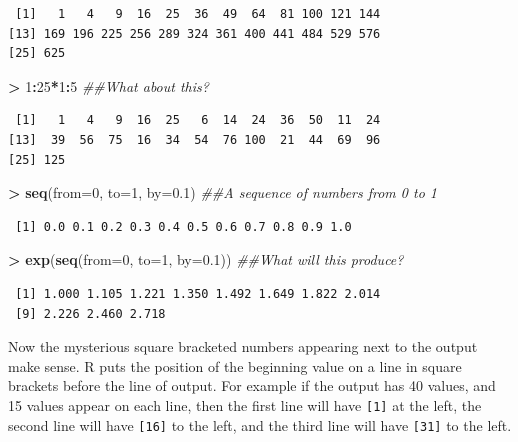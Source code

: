 \documentclass[
]{krantz}
\makeatletter
\newenvironment{Shaded}{\begin{snugshade}}{\end{snugshade}}
\newcommand{\CommentTok}[1]{\textcolor[rgb]{0.37,0.37,0.37}{\textit{#1}}}
\newcommand{\DataTypeTok}[1]{\textcolor[rgb]{0.27,0.27,0.27}{#1}}
\newcommand{\DecValTok}[1]{\textcolor[rgb]{0.06,0.06,0.06}{#1}}
\newcommand{\FloatTok}[1]{\textcolor[rgb]{0.06,0.06,0.06}{#1}}
\newcommand{\KeywordTok}[1]{\textcolor[rgb]{0.27,0.27,0.27}{\textbf{#1}}}
\newcommand{\NormalTok}[1]{#1}
\newcommand{\OperatorTok}[1]{\textcolor[rgb]{0.43,0.43,0.43}{\textbf{#1}}}
\newcommand{\StringTok}[1]{\textcolor[rgb]{0.5,0.5,0.5}{#1}}
\newenvironment{kframe}{%
\medskip{}
\setlength{\fboxsep}{.8em}
 \def\at@end@of@kframe{}%
 \ifinner\ifhmode%
  \def\at@end@of@kframe{\end{minipage}}%
  \begin{minipage}{\columnwidth}%
 \fi\fi%
 \def\FrameCommand##1{\hskip\@totalleftmargin \hskip-\fboxsep
 \colorbox{shadecolor}{##1}\hskip-\fboxsep
     \hskip-\linewidth \hskip-\@totalleftmargin \hskip\columnwidth}%
 \MakeFramed {\advance\hsize-\width
   \@totalleftmargin\z@ \linewidth\hsize
   \@setminipage}}%
 {\par\unskip\endMakeFramed%
 \at@end@of@kframe}
\renewenvironment{Shaded}{\begin{kframe}}{\end{kframe}}
\makeatother
\begin{document}
\begin{verbatim}
 [1]   1   4   9  16  25  36  49  64  81 100 121 144
[13] 169 196 225 256 289 324 361 400 441 484 529 576
[25] 625
\end{verbatim}

\begin{Shaded}
\begin{Highlighting}[]
\OperatorTok{\textgreater{}}\StringTok{ }\DecValTok{1}\OperatorTok{:}\DecValTok{25}\OperatorTok{*}\DecValTok{1}\OperatorTok{:}\DecValTok{5} \CommentTok{\#\#What about this?}
\end{Highlighting}
\end{Shaded}

\begin{verbatim}
 [1]   1   4   9  16  25   6  14  24  36  50  11  24
[13]  39  56  75  16  34  54  76 100  21  44  69  96
[25] 125
\end{verbatim}

\begin{Shaded}
\begin{Highlighting}[]
\OperatorTok{\textgreater{}}\StringTok{ }\KeywordTok{seq}\NormalTok{(}\DataTypeTok{from=}\DecValTok{0}\NormalTok{, }\DataTypeTok{to=}\DecValTok{1}\NormalTok{, }\DataTypeTok{by=}\FloatTok{0.1}\NormalTok{) }\CommentTok{\#\#A sequence of numbers from 0 to 1}
\end{Highlighting}
\end{Shaded}

\begin{verbatim}
 [1] 0.0 0.1 0.2 0.3 0.4 0.5 0.6 0.7 0.8 0.9 1.0
\end{verbatim}

\begin{Shaded}
\begin{Highlighting}[]
\OperatorTok{\textgreater{}}\StringTok{ }\KeywordTok{exp}\NormalTok{(}\KeywordTok{seq}\NormalTok{(}\DataTypeTok{from=}\DecValTok{0}\NormalTok{, }\DataTypeTok{to=}\DecValTok{1}\NormalTok{, }\DataTypeTok{by=}\FloatTok{0.1}\NormalTok{)) }\CommentTok{\#\#What will this produce?}
\end{Highlighting}
\end{Shaded}

\begin{verbatim}
 [1] 1.000 1.105 1.221 1.350 1.492 1.649 1.822 2.014
 [9] 2.226 2.460 2.718
\end{verbatim}

Now the mysterious square bracketed numbers appearing next to the output make sense. R puts the position of the beginning value on a line in square brackets before the line of output. For example if the output has 40 values, and 15 values appear on each line, then the first line will have \texttt{{[}1{]}} at the left, the second line will have \texttt{{[}16{]}} to the left, and the third line will have \texttt{{[}31{]}} to the left.
\end{document}
